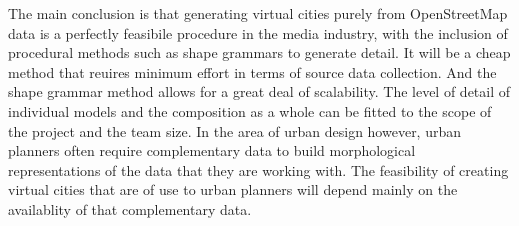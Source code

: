 \documentclass{kththesis}
\begin{document}
The main conclusion is that generating virtual cities purely from OpenStreetMap data is a perfectly feasibile procedure in the media industry, with the inclusion of procedural methods such as shape grammars to generate detail.
It will be a cheap method that reuires minimum effort in terms of source data collection. And the shape grammar method allows for a great deal of scalability.
The level of detail of individual models and the composition as a whole can be fitted to the scope of the project and the team size.
In the area of urban design however, urban planners often require complementary data to build morphological representations of the data that they are working with.
The feasibility of creating virtual cities that are of use to urban planners will depend mainly on the availablity of that complementary data.
\end{document}
